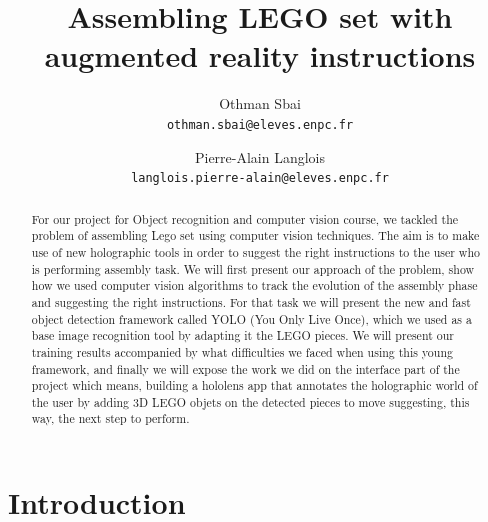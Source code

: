 \documentclass[10pt,twocolumn,letterpaper]{article}
\begin{document}
\title{Assembling LEGO set with augmented reality instructions}

\author{Othman Sbai\\
{\tt\small othman.sbai@eleves.enpc.fr}
\and
Pierre-Alain Langlois\\
{\tt\small langlois.pierre-alain@eleves.enpc.fr}
}

\maketitle

\begin{abstract}
   For our project for Object recognition and computer vision course, we tackled the problem of assembling Lego set using computer vision techniques. The aim is to make use of new holographic tools in order to suggest the right instructions to the user who is performing assembly task. We will first present our approach of the problem, show how we used computer vision algorithms to track the evolution of the assembly phase and suggesting the right instructions. For that task we will present the new and fast object detection framework called YOLO (You Only Live Once), which we used as a base image recognition tool by adapting it the LEGO pieces. We will present our training results accompanied by what difficulties we faced when using this young framework, and finally we will expose the work we did on the interface part of the project which means, building a hololens app that annotates the holographic world of the user by adding 3D LEGO objets on the detected pieces to move suggesting, this way, the next step to perform.
\end{abstract}

\section{Introduction}
\end{document}
